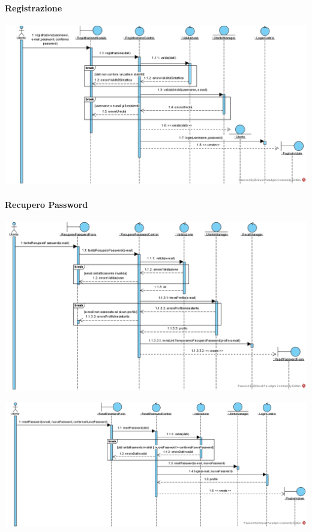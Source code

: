 \paragraph{Registrazione}
\begin{center}
\includegraphics[width=\textwidth,height=\textheight,keepaspectratio]{Figure/SequenceDiagrams/Registrazione.jpg}
\end{center}

\paragraph{Recupero Password}
\begin{center}
\includegraphics[width=\textwidth,height=\textheight,keepaspectratio]{Figure/SequenceDiagrams/TentaRecuperoPassword.jpg}
\end{center}

\newpage
\begin{center}
\includegraphics[width=\textwidth,height=\textheight,keepaspectratio]{Figure/SequenceDiagrams/ResetPassword.jpg}
\end{center}

